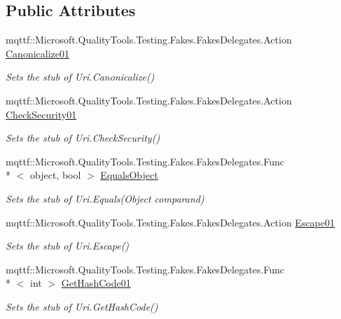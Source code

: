 \subsection*{Public Attributes}
\begin{DoxyCompactItemize}
\item 
mqttf\-::\-Microsoft.\-Quality\-Tools.\-Testing.\-Fakes.\-Fakes\-Delegates.\-Action \hyperlink{class_system_1_1_fakes_1_1_stub_uri_a5ed259970d9069374066aa0ebad29901}{Canonicalize01}
\begin{DoxyCompactList}\small\item\em Sets the stub of Uri.\-Canonicalize()\end{DoxyCompactList}\item 
mqttf\-::\-Microsoft.\-Quality\-Tools.\-Testing.\-Fakes.\-Fakes\-Delegates.\-Action \hyperlink{class_system_1_1_fakes_1_1_stub_uri_a9ad4f168b2d703b83074bc9c9d524671}{Check\-Security01}
\begin{DoxyCompactList}\small\item\em Sets the stub of Uri.\-Check\-Security()\end{DoxyCompactList}\item 
mqttf\-::\-Microsoft.\-Quality\-Tools.\-Testing.\-Fakes.\-Fakes\-Delegates.\-Func\\*
$<$ object, bool $>$ \hyperlink{class_system_1_1_fakes_1_1_stub_uri_a0b77e9c3b21b1d7f78a8173f52fe16b0}{Equals\-Object}
\begin{DoxyCompactList}\small\item\em Sets the stub of Uri.\-Equals(\-Object comparand)\end{DoxyCompactList}\item 
mqttf\-::\-Microsoft.\-Quality\-Tools.\-Testing.\-Fakes.\-Fakes\-Delegates.\-Action \hyperlink{class_system_1_1_fakes_1_1_stub_uri_abb95e900aac9932a06966dbe5f15e696}{Escape01}
\begin{DoxyCompactList}\small\item\em Sets the stub of Uri.\-Escape()\end{DoxyCompactList}\item 
mqttf\-::\-Microsoft.\-Quality\-Tools.\-Testing.\-Fakes.\-Fakes\-Delegates.\-Func\\*
$<$ int $>$ \hyperlink{class_system_1_1_fakes_1_1_stub_uri_a0dae92a8ab0af4633382d6fad1856e41}{Get\-Hash\-Code01}
\begin{DoxyCompactList}\small\item\em Sets the stub of Uri.\-Get\-Hash\-Code()\end{DoxyCompactList}\item 

\end{DoxyCompactItemize}
